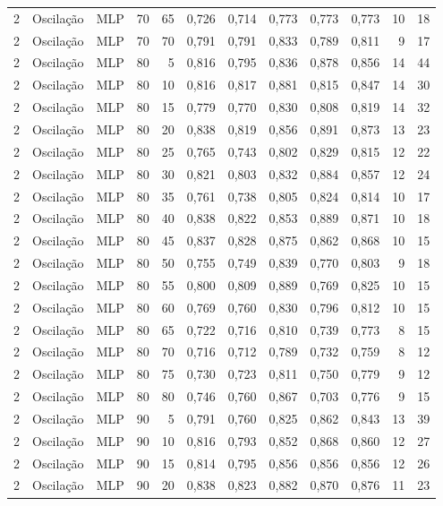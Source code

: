 \begin{longtable}{ccclrrrrrrrr}
2 & Oscilação & MLP & 70 & 65 & 0,726 & 0,714 & 0,773 & 0,773 & 0,773 & 10 & 18 \\
2 & Oscilação & MLP & 70 & 70 & 0,791 & 0,791 & 0,833 & 0,789 & 0,811 & 9 & 17 \\
2 & Oscilação & MLP & 80 & 5 & 0,816 & 0,795 & 0,836 & 0,878 & 0,856 & 14 & 44 \\
2 & Oscilação & MLP & 80 & 10 & 0,816 & 0,817 & 0,881 & 0,815 & 0,847 & 14 & 30 \\
2 & Oscilação & MLP & 80 & 15 & 0,779 & 0,770 & 0,830 & 0,808 & 0,819 & 14 & 32 \\
2 & Oscilação & MLP & 80 & 20 & 0,838 & 0,819 & 0,856 & 0,891 & 0,873 & 13 & 23 \\
2 & Oscilação & MLP & 80 & 25 & 0,765 & 0,743 & 0,802 & 0,829 & 0,815 & 12 & 22 \\
2 & Oscilação & MLP & 80 & 30 & 0,821 & 0,803 & 0,832 & 0,884 & 0,857 & 12 & 24 \\
2 & Oscilação & MLP & 80 & 35 & 0,761 & 0,738 & 0,805 & 0,824 & 0,814 & 10 & 17 \\
2 & Oscilação & MLP & 80 & 40 & 0,838 & 0,822 & 0,853 & 0,889 & 0,871 & 10 & 18 \\
2 & Oscilação & MLP & 80 & 45 & 0,837 & 0,828 & 0,875 & 0,862 & 0,868 & 10 & 15 \\
2 & Oscilação & MLP & 80 & 50 & 0,755 & 0,749 & 0,839 & 0,770 & 0,803 & 9 & 18 \\
2 & Oscilação & MLP & 80 & 55 & 0,800 & 0,809 & 0,889 & 0,769 & 0,825 & 10 & 15 \\
2 & Oscilação & MLP & 80 & 60 & 0,769 & 0,760 & 0,830 & 0,796 & 0,812 & 10 & 15 \\
2 & Oscilação & MLP & 80 & 65 & 0,722 & 0,716 & 0,810 & 0,739 & 0,773 & 8 & 15 \\
2 & Oscilação & MLP & 80 & 70 & 0,716 & 0,712 & 0,789 & 0,732 & 0,759 & 8 & 12 \\
2 & Oscilação & MLP & 80 & 75 & 0,730 & 0,723 & 0,811 & 0,750 & 0,779 & 9 & 12 \\
2 & Oscilação & MLP & 80 & 80 & 0,746 & 0,760 & 0,867 & 0,703 & 0,776 & 9 & 15 \\
2 & Oscilação & MLP & 90 & 5 & 0,791 & 0,760 & 0,825 & 0,862 & 0,843 & 13 & 39 \\
2 & Oscilação & MLP & 90 & 10 & 0,816 & 0,793 & 0,852 & 0,868 & 0,860 & 12 & 27 \\
2 & Oscilação & MLP & 90 & 15 & 0,814 & 0,795 & 0,856 & 0,856 & 0,856 & 12 & 26 \\
2 & Oscilação & MLP & 90 & 20 & 0,838 & 0,823 & 0,882 & 0,870 & 0,876 & 11 & 23 \\

\end{longtable}
